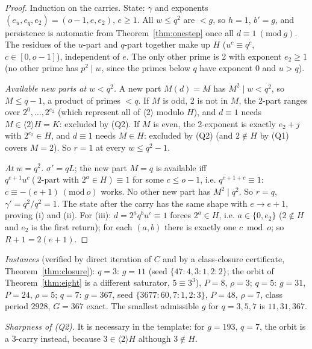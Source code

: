 \begin{proof}
Induction on the carries. State: \(\gamma\) and exponents \((e_u,e_q,e_2)=(o-1,e,e_2)\), \(e\ge1\). All \(w\le q^2\) are \(<g\), so \(h=1\), \(b'=g\), and persistence is automatic from Theorem~\ref{thm:onestep} once all \(d\equiv1\ (\mathrm{mod}\ g)\). The residues of the \(u\)-part and \(q\)-part together make up \(H\) (\(u^c\equiv q^c\), \(c\in[0,o-1]\)), independent of \(e\). The only other prime is 2 with exponent \(e_2\ge1\) (no other prime has \(p^2\mid w\), since the primes below \(q\) have exponent 0 and \(u>q\)).

\emph{Available new parts at \(w<q^2\).} A new part \(M(d)=M\) has \(M^2\mid w<q^2\), so \(M\le q-1\), a product of primes \(<q\). If \(M\) is odd, 2 is not in \(M\), the 2-part ranges over \(2^0,\dots,2^{e_2}\) (which represent all of \(\langle2\rangle\) modulo \(H\)), and \(d\equiv1\) needs \(M\in\langle2\rangle H=K\): excluded by (Q2). If \(M\) is even, the 2-exponent is exactly \(e_2+j\) with \(2^{e_2}\in H\), and \(d\equiv1\) needs \(M\in H\): excluded by (Q2) (and \(2\notin H\) by (Q1) covers \(M=2\)). So \(r=1\) at every \(w\le q^2-1\).

\emph{At \(w=q^2\).} \(\sigma'=qL\); the new part \(M=q\) is available iff \(q^{e+1}u^c(2\text{-part with }2^a\in H)\equiv1\) for some \(c\le o-1\), i.e. \(q^{e+1+c}\equiv1\): \(c\equiv-(e+1)\ (\mathrm{mod}\ o)\) works. No other new part has \(M^2\mid q^2\). So \(r=q\), \(\gamma'=q^2/q^2=1\). The state after the carry has the same shape with \(e\to e+1\), proving (i) and (ii). For (iii): \(d=2^aq^bu^c\equiv1\) forces \(2^a\in H\), i.e. \(a\in\{0,e_2\}\) (\(2\notin H\) and \(e_2\) is the first return); for each \((a,b)\) there is exactly one \(c\bmod o\); so \(R+1=2(e+1)\).
\end{proof}

\emph{Instances} (verified by direct iteration of \(C\) and by a class-closure certificate, Theorem~\ref{thm:closure}): \(q=3\): \(g=11\) (seed \(\{47:4,3:1,2:2\}\); the orbit of Theorem~\ref{thm:eight} is a different saturator, \(5\equiv3^3\)), \(P=8\), \(\rho=3\); \(q=5\): \(g=31\), \(P=24\), \(\rho=5\); \(q=7\): \(g=367\), seed \(\{3677:60,7:1,2:3\}\), \(P=48\), \(\rho=7\), class period 2928, \(G=367\) exact. The smallest admissible \(g\) for \(q=3,5,7\) is \(11,31,367\).

\emph{Sharpness of (Q2).} It is necessary in the template: for \(g=193\), \(q=7\), the orbit is a 3-carry instead, because \(3\in\langle2\rangle H\) although \(3\notin H\).

